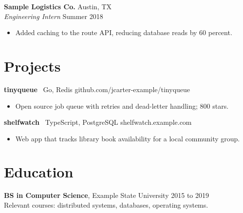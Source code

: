 \documentclass[10pt]{article}
\newcommand{\role}[4]{%
  \textbf{#1} \hfill #2\\
  \emph{#3} \hfill {\small #4}}
\newcommand{\project}[3]{\textbf{#1} \textbar\ {\small #2} \hfill {\small\color{brand}#3}}
\begin{document}
\role{Sample Logistics Co.}{Austin, TX}{Engineering Intern}{Summer 2018}
\begin{itemize}
  \item Added caching to the route API, reducing database reads by 60 percent.
\end{itemize}

\section{Projects}
\project{tinyqueue}{Go, Redis}{github.com/jcarter-example/tinyqueue}
\begin{itemize}
  \item Open source job queue with retries and dead-letter handling; 800 stars.
\end{itemize}
\project{shelfwatch}{TypeScript, PostgreSQL}{shelfwatch.example.com}
\begin{itemize}
  \item Web app that tracks library book availability for a local community group.
\end{itemize}

\section{Education}
\textbf{BS in Computer Science}, Example State University \hfill 2015 to 2019\\
Relevant courses: distributed systems, databases, operating systems.
\end{document}
